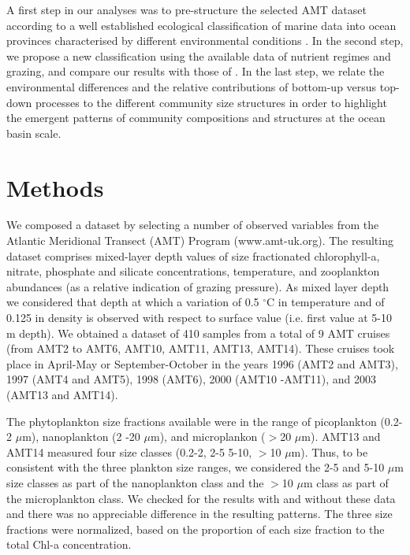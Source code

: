A first step in our analyses was to pre-structure the selected AMT dataset according to a well established ecological classification of marine data into ocean provinces characterised by different environmental conditions \citep{Longhurst2006}. In the second step, we propose a new classification using the available data of nutrient regimes and grazing, and compare our results with those of \citet{Longhurst2006}. In the last step, we relate the environmental differences and the relative contributions of bottom-up versus top-down processes to the different community size structures in order to highlight the emergent patterns of community compositions and structures at the ocean basin scale.

\section{Methods}

We composed a dataset by selecting a number of observed variables from the Atlantic Meridional Transect (AMT) Program (www.amt-uk.org). The resulting dataset comprises mixed-layer depth values of size fractionated chlorophyll-a, nitrate, phosphate and silicate concentrations, temperature, and zooplankton abundances (as a relative indication of grazing pressure). As mixed layer depth we considered that depth at which a variation of 0.5 $^\circ$C in temperature and of 0.125 in density is observed with respect to surface value (i.e. first value at 5-10 m depth). We obtained a dataset of 410 samples from a total of 9 AMT cruises (from AMT2 to AMT6, AMT10, AMT11, AMT13, AMT14). These cruises took place in April-May or September-October in the years 1996 (AMT2 and AMT3), 1997 (AMT4 and AMT5), 1998 (AMT6), 2000 (AMT10 -AMT11), and 2003 (AMT13 and AMT14). 

The phytoplankton size fractions available were in the range of picoplankton (0.2-2 $\mu$m), nanoplankton (2 -20 $\mu$m), and microplankon ($>$20 $\mu$m). AMT13 and AMT14 measured four size classes (0.2-2, 2-5 5-10, $>$10 $\mu$m). Thus, to be consistent with the three plankton size ranges, we considered the 2-5 and 5-10 $\mu$m size classes as part of the nanoplankton class and the $>$10 $\mu$m class as part of the microplankton class. We checked for the results with and without these data and there was no appreciable difference in the resulting patterns. The three size fractions were normalized, based on the proportion of each size fraction to the total Chl-a concentration.

